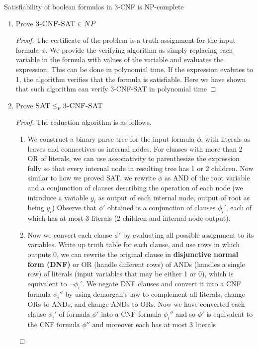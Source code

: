\documentclass[11pt]{article}
\begin{document}
\begin{theorem*}
    Satisfiability of boolean formulas in 3-CNF is NP-complete 
    \begin{enumerate}
        \item Prove $\textsc{3-CNF-SAT} \in NP$
        \begin{proof}
            The certificate of the problem is a truth assignment for the input formula $\phi$. We provide the verifying algorithm as simply replacing each variable in the formula with values of the variable and evaluates the expression. This can be done in polynomial time. If the expression evalutes to 1, the algorithm verifies that the formula is satisfiable. Here we have shown that such algorithm can verify \textsc{3-CNF-SAT} in polynomial time
        \end{proof}
        \item Prove $\textsc{SAT} \leq_p \textsc{3-CNF-SAT}$
        \begin{proof}
            The reduction algorithm is as follows. 
            \begin{enumerate}
                \item We construct a binary parse tree for the input formula $\phi$, with literals as leaves and connectives as internal nodes. For cluases with more than 2 OR of literals, we can use associativity to parenthesize the expression fully so that every internal node in resulting tree has 1 or 2 children. Now similar to how we proved \textsc{SAT}, we rewrite $\phi$ as AND of the root variable and a conjunction of clauses describing the operation of each node (we introduce a variable $y_i$ as output of each internal node, output of root as being $y_i$) Observe that $\phi'$ obtained is a conjunction of clauses $\phi_i'$, each of which has at most 3 literals (2 children and internal node output).
                \item  Now we convert each clause $\phi'$ by evaluating all possible assignment to its variables. Write up truth table for each clause, and use rows in which outputs 0, we can rewrite the original clause in \textbf{disjunctive normal form (DNF)} or OR (handle different rows) of ANDs (handles a single row) of literals (input variables that may be either 1 or 0), which is equivalent to $\neg \phi_i'$. We negate DNF clauses and convert it into a CNF formula $\phi_i''$ by using demorgan's law to complement all literals, change ORs to ANDs, and change ANDs to ORs. Now we have converted each clause $\phi_i'$ of formula $\phi'$ into a CNF formula $\phi_i''$ and so $\phi'$ is equivalent to the CNF formula $\phi''$ and moreover each has at most 3 literals 

\end{enumerate}
\end{proof}
\end{enumerate}
\end{theorem*}
\end{document}
